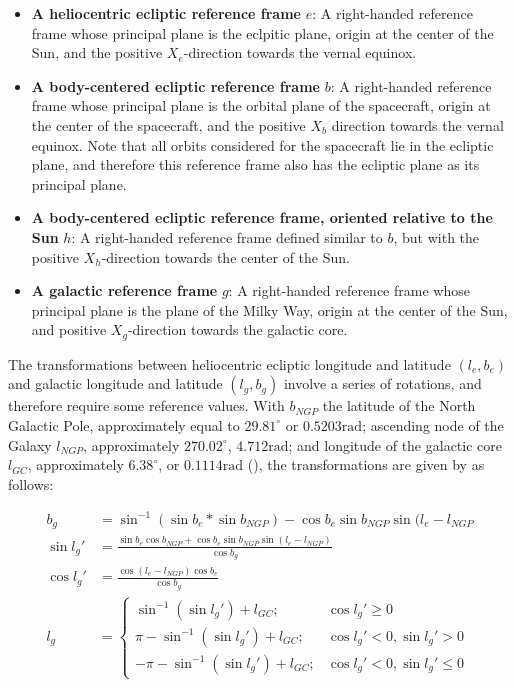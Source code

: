 \begin{itemize}
 \item \textbf{A heliocentric ecliptic reference frame} $e$: A right-handed reference frame whose principal plane is the eclpitic plane, origin at the center of the Sun, and the positive $X_e$-direction towards the vernal equinox.
 \item \textbf{A body-centered ecliptic reference frame} $b$: A right-handed reference frame whose principal plane is the orbital plane of the spacecraft, origin at the center of the spacecraft, and the positive $X_b$ direction towards the vernal equinox. Note that all orbits considered for the spacecraft lie in the ecliptic plane, and therefore this reference frame also has the ecliptic plane as its principal plane.
 \item \textbf{A body-centered ecliptic reference frame, oriented relative to the Sun} $h$: A right-handed reference frame defined similar to $b$, but with the positive $X_h$-direction towards the center of the Sun.
 \item \textbf{A galactic reference frame} $g$: A right-handed reference frame whose principal plane is the plane of the Milky Way, origin at the center of the Sun, and positive $X_g$-direction towards the galactic core.
\end{itemize}


The transformations between heliocentric ecliptic longitude and latitude $(l_e, b_e)$ and galactic longitude and latitude $(l_g, b_g)$ involve a series of rotations, and therefore require some reference values. With $b_{NGP}$ the latitude of the North Galactic Pole, approximately equal to $29.81^\circ$ or $0.5203 \mathrm{rad}$; ascending node of the Galaxy $l_{NGP}$, approximately $270.02^\circ$, $4.712 \mathrm{rad}$; and longitude of the galactic core $l_{GC}$, approximately $6.38^\circ$, or $0.1114 \mathrm{rad}$ (\cite{SkyBrightness}), the transformations are given by \cite{SkyBrightness} as follows:

\begin{align}
 b_g &= \sin ^{-1} (\sin b_e * \sin b_{NGP}) - \cos b_e \sin b_{NGP} \sin (l_e - l_{NGP} \\
 \sin l_g' &= \frac{\sin b_e \cos b_{NGP} + \cos b_e \sin b_{NGP} \sin (l_e - l_{NGP})}{\cos b_g} \\
 \cos l_g' &= \frac{\cos (l_e - l_{NGP}) \cos b_e}{\cos b_g} \\
 l_g &= \begin{cases}
        \sin ^{-1} (\sin l_g') + l_{GC}; & \cos l_g' \geq 0 \\
        \pi - \sin^{-1} (\sin l_g') + l_{GC}; & \cos l_g' < 0, \sin l_g' > 0 \\
        - \pi - \sin^{-1} (\sin l_g') + l_{GC}; & \cos l_g' < 0, \sin l_g' \leq 0
       \end{cases}
\end{align}


